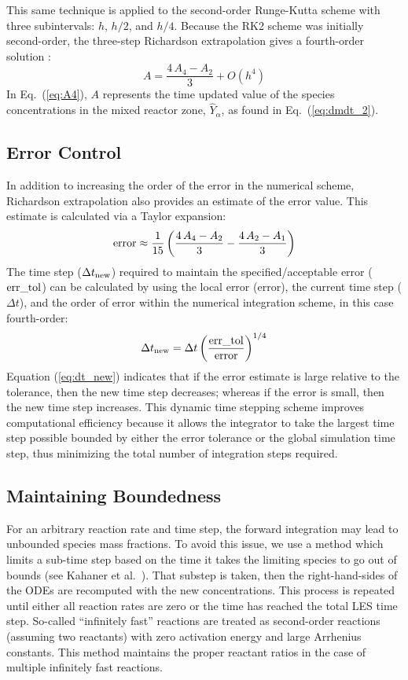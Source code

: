 This same technique is applied to the second-order Runge-Kutta scheme with three subintervals: $h$, $h/2$, and $h/4$. Because the RK2 scheme was initially second-order, the three-step Richardson extrapolation gives a fourth-order solution \cite{Moin:2001}:
\begin{equation}\label{eq:A4}
A=\frac{4\,A_4-A_2}{3}  + \mathit{O}(h^4)
\end{equation}
In Eq.~(\ref{eq:A4}), $A$ represents the time updated value of the species concentrations in the mixed reactor zone, $\hat{Y}_{\alpha}$, as found in Eq.~(\ref{eq:dmdt_2}).

\subsection*{Error Control}

In addition to increasing the order of the error in the numerical scheme, Richardson extrapolation also provides an estimate of the error value. This estimate is calculated via a Taylor expansion:
\begin{equation}\label{eq:error}
\hbox{error} \approx \frac{1}{15}\left(\frac{4\,A_4-A_2}{3} - \frac{4\,A_2-A_1}{3}\right)
\end{equation}
The time step ($\Delta t_{\rm new}$) required to maintain the specified/acceptable error ($\rm err\_tol$) can be calculated by using the local error (error), the current time step ($\Delta t$), and the order of error within the numerical integration scheme, in this case fourth-order:
\begin{equation}\label{eq:dt_new}
\Delta t_{\rm new}=\Delta t \left(\frac{\rm err\_tol}{\rm error}\right)^{1/4}
\end{equation}
Equation (\ref{eq:dt_new}) indicates that if the error estimate is large relative to the tolerance, then the new time step decreases; whereas if the error is small, then the new time step increases. This dynamic time stepping scheme improves computational efficiency because it allows the integrator to take the largest time step possible bounded by either the error tolerance or the global simulation time step, thus minimizing the total number of integration steps required.

\subsection*{Maintaining Boundedness}

For an arbitrary reaction rate and time step, the forward integration may lead to unbounded species mass fractions.  To avoid this issue, we use a method which limits a sub-time step based on the time it takes the limiting species to go out of bounds (see Kahaner et al.~\cite{Kahaner:1989}).  That substep is taken, then the right-hand-sides of the ODEs are recomputed with the new concentrations.  This process is repeated until either all reaction rates are zero or the time has reached the total LES time step.  So-called ``infinitely fast'' reactions are treated as second-order reactions (assuming two reactants) with zero activation energy and large Arrhenius constants.  This method maintains the proper reactant ratios in the case of multiple infinitely fast reactions.

